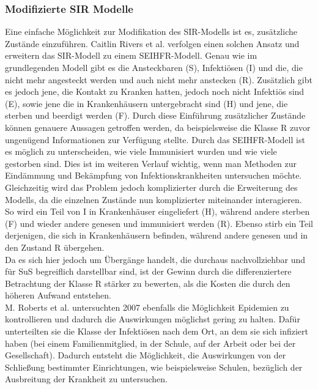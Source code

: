\subsubsection{Modifizierte SIR Modelle}
\ellen
Eine einfache Möglichkeit zur Modifikation des SIR-Modells ist es, zusätzliche Zustände einzuführen. Caitlin Rivers et al. verfolgen einen solchen Ansatz und erweitern das SIR-Modell zu einem SEIHFR-Modell. 
Genau wie im grundlegenden Modell gibt es die Ansteckbaren (S), Infektiösen (I) und die, die nicht mehr angesteckt werden und auch nicht mehr anstecken (R). Zusätzlich gibt es jedoch jene, die Kontakt zu Kranken hatten, jedoch noch nicht Infektiös sind (E), sowie jene die in Krankenhäusern untergebracht sind (H) und jene, die sterben und beerdigt werden (F).
Durch diese Einführung zusätzlicher Zustände können genauere Aussagen getroffen werden, da beispielsweise die Klasse R zuvor ungenügend Informationen zur Verfügung stellte. Durch das SEIHFR-Modell ist es möglich zu unterscheiden, wie viele Immunisiert wurden und wie viele gestorben sind. Dies ist im weiteren Verlauf wichtig, wenn man Methoden zur Eindämmung und Bekämpfung von Infektionskrankheiten untersuchen möchte. Gleichzeitig wird das Problem jedoch komplizierter durch die Erweiterung des Modells, da die einzelnen Zustände nun komplizierter miteinander interagieren.\\
So wird ein Teil von I in Krankenhäuser eingeliefert (H), während andere sterben (F) und wieder andere genesen und immunisiert werden (R). Ebenso stirb ein Teil derjenigen, die sich in Krankenhäusern befinden, während andere genesen und in den Zustand R übergehen.\\
Da es sich hier jedoch um Übergänge handelt, die durchaus nachvollziehbar und für SuS begreiflich darstellbar sind, ist der Gewinn durch die differenziertere Betrachtung der Klasse R stärker zu bewerten, als die Kosten die durch den höheren Aufwand entstehen.\\
M. Roberts et al. untersuchten 2007 ebenfalls die Möglichkeit Epidemien zu kontrollieren und dadurch die Auswirkungen möglichst gering zu halten. Dafür unterteilten sie die Klasse der Infektiösen nach dem Ort, an dem sie sich infiziert haben (bei einem Familienmitglied, in der Schule, auf der Arbeit oder bei der Gesellschaft). Dadurch entsteht die Möglichkeit, die Auswirkungen von der Schließung bestimmter Einrichtungen, wie beispielsweise Schulen, bezüglich der Ausbreitung der Krankheit zu untersuchen.\\
